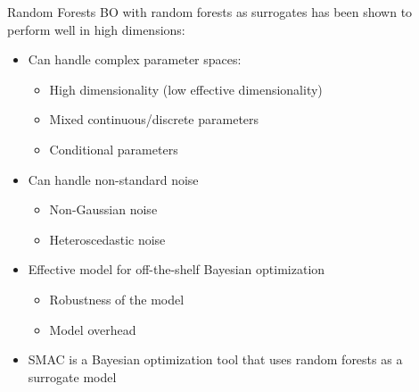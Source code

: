 \begin{frame}{Random Forests}
BO with random forests as surrogates has been shown to perform well in high dimensions:
\begin{itemize}
    \item Can handle complex parameter spaces:
    \begin{itemize}
        \item High dimensionality (low effective dimensionality)
        \item Mixed continuous/discrete parameters
        \item Conditional parameters
    \end{itemize}
\pause
\smallskip
    \item Can handle non-standard noise
    \begin{itemize}
        \item Non-Gaussian noise
        \item Heteroscedastic noise
    \end{itemize}
\pause
\smallskip
    \item Effective model for off-the-shelf Bayesian optimization
    \begin{itemize}
        \item Robustness of the model
        \item Model overhead
    \end{itemize}
\pause
\smallskip
    \item SMAC is a Bayesian optimization tool that uses random forests as a surrogate model
\end{itemize}
\end{frame}




